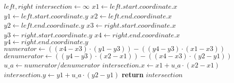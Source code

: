\begin{algorithm}[!ht]
\caption{}
\label{alg:linesegmenintersection}
\begin{algorithmic}[1]
	\Require $\mathit{left}, \mathit{right}$
	\State $\mathit{intersection} \gets \infty$
	\State $\mathit{x1} \gets \mathit{left.start.coordinate.x}$
	\label{alg:linesegmenintersection-var-start}
	\State $\mathit{y1} \gets \mathit{left.start.coordinate.y}$
	\State $\mathit{x2} \gets \mathit{left.end.coordinate.x}$
	\State $\mathit{y2} \gets \mathit{left.end.coordinate.y}$
	\State $\mathit{x3} \gets \mathit{right.start.coordinate.x}$
	\State $\mathit{y3} \gets \mathit{right.start.coordinate.y}$
	\State $\mathit{x4} \gets \mathit{right.end.coordinate.x}$
	\State $\mathit{y4} \gets \mathit{right.end.coordinate.y}$
	\label{alg:linesegmenintersection-var-end}
	\State $\mathit{numerator} \gets ((\mathit{x4} - \mathit{x3}) \cdot (\mathit{y1} - \mathit{y3})) - ((\mathit{y4} - \mathit{y3}) \cdot (\mathit{x1} - \mathit{x3}))$
	\label{alg:linesegmenintersection-intersect-start}
	\State $\mathit{denumerator} \gets ((\mathit{y4} - \mathit{y3}) \cdot (\mathit{x2} - \mathit{x1})) - ((\mathit{x4} - \mathit{x3}) \cdot (\mathit{y2} - \mathit{y1}))$
	\State $\mathit{u\_a} \gets \mathit{numerator} / \mathit{denumerator}$
	\State $\mathit{intersection.x} \gets \mathit{x1} + \mathit{u\_a} \cdot (\mathit{x2} - \mathit{x1})$
	\State $\mathit{intersection.y} \gets \mathit{y1} + \mathit{u\_a} \cdot (\mathit{y2} - \mathit{y1})$
	\label{alg:linesegmenintersection-intersect-end}
	\State \textbf{return} $\mathit{intersection}$
	\label{alg:linesegmenintersection-return}
\end{algorithmic}
\end{algorithm}
